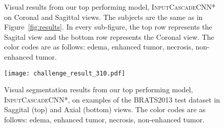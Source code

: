 \documentclass[final,5p,times,twocolumn]{elsarticle}
\begin{document}
{\begin{figure}[tp]
\caption{Visual results from our top performing model, \textsc{InputCascadeCNN*} on Coronal and Sagittal views. The subjects are the same as in Figure~\ref{fig:results}. In every sub-figure, the top row represents the Sagital view and the bottom row represents the Coronal view. The color codes are as follows:  \textcolor[RGB]{135,213,120}{} edema, \textcolor[RGB]{225,225,95}{} enhanced tumor,
\textcolor[RGB]{246,145,139}{} necrosis,
\textcolor[RGB]{124,167,208}{} non-enhanced tumor.}
\label{fig:multiple_views}
\end{figure}




\begin{figure}[tp]
\centering

\texttt{[image: challenge\_result\_310.pdf]}

\caption{Visual segmentation results from our top performing model, \textsc{InputCascadeCNN*}, on examples of the BRATS2013 test dataset in Saggital (top) and Axial (bottom) views. The color codes are as follows:  \textcolor[RGB]{135,213,120}{} edema, \textcolor[RGB]{225,225,95}{} enhanced tumor,
\textcolor[RGB]{246,145,139}{} necrosis,
\textcolor[RGB]{124,167,208}{} non-enhanced tumor.}
\label{fig:testresults}
\end{figure} 

\begin{table*}[tp]
\begin{center}
\caption{Performance of the \textsc{TwoPathCNN} model and variations. The second phase training is noted by appending `*' to the architecture name. The `Rank' column represents the ranking of each method in the online score board at the time of submission.} 


\end{center}
\end{table*}}
\end{document}

